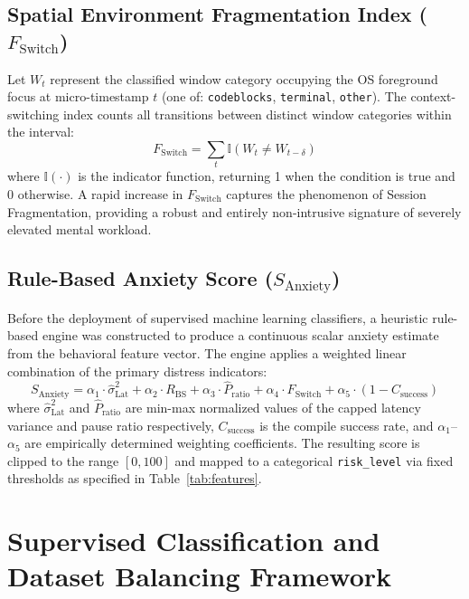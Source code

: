\subsection{Spatial Environment Fragmentation Index ($F_{\text{Switch}}$)}
Let $W_t$ represent the classified window category occupying the OS foreground focus at micro-timestamp $t$ (one of: \texttt{codeblocks}, \texttt{terminal}, \texttt{other}). The context-switching index counts all transitions between distinct window categories within the interval:
\begin{equation}
F_{\text{Switch}} = \sum_{t} \mathbb{I}\!\left(W_t \neq W_{t-\delta}\right)
\end{equation}
where $\mathbb{I}(\cdot)$ is the indicator function, returning 1 when the condition is true and 0 otherwise. A rapid increase in $F_{\text{Switch}}$ captures the phenomenon of Session Fragmentation, providing a robust and entirely non-intrusive signature of severely elevated mental workload.

\subsection{Rule-Based Anxiety Score ($S_{\text{Anxiety}}$)}
Before the deployment of supervised machine learning classifiers, a heuristic rule-based engine was constructed to produce a continuous scalar anxiety estimate from the behavioral feature vector. The engine applies a weighted linear combination of the primary distress indicators:
\begin{equation}
S_{\text{Anxiety}} = \alpha_1 \cdot \hat{\sigma}^2_{\text{Lat}} + \alpha_2 \cdot R_{\text{BS}} + \alpha_3 \cdot \hat{P}_{\text{ratio}} + \alpha_4 \cdot F_{\text{Switch}} + \alpha_5 \cdot (1 - C_{\text{success}})
\end{equation}
where $\hat{\sigma}^2_{\text{Lat}}$ and $\hat{P}_{\text{ratio}}$ are min-max normalized values of the capped latency variance and pause ratio respectively, $C_{\text{success}}$ is the compile success rate, and $\alpha_1$--$\alpha_5$ are empirically determined weighting coefficients. The resulting score is clipped to the range $[0, 100]$ and mapped to a categorical \texttt{risk\_level} via fixed thresholds as specified in Table~\ref{tab:features}.

\section[Classification and Dataset Balancing]{Supervised Classification and Dataset Balancing Framework}
\label{sec:ml_framework}

